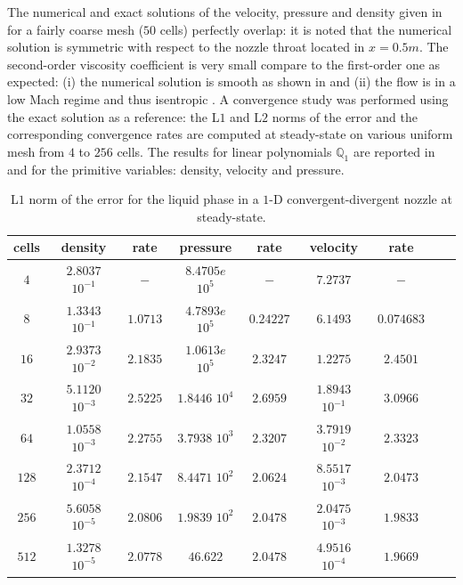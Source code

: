 The numerical and exact solutions of the velocity, pressure and density given in  for a fairly coarse mesh ($50$ cells) perfectly overlap: it is noted that the numerical solution is symmetric with respect to the nozzle throat located in $x=0.5m$. The second-order viscosity coefficient  is very small compare to the first-order one as expected: (i) the numerical solution is smooth as shown in  and (ii) the flow is in a low Mach regime and thus isentropic . A convergence study was performed using the exact solution as a reference: the L$1$ and L$2$ norms of the error and the corresponding convergence rates are computed at steady-state on various uniform mesh from $4$ to $256$ cells. The results for linear polynomials $\mathbb{Q}_1$ are reported in  and  for the primitive variables: density, velocity and pressure.
\begin{table}[H]
\begin{center}
 \caption{\label{tbl:l1_norm_liq} L$1$ norm of the error for the liquid phase in a $1$-D convergent-divergent nozzle at steady-state.}
 \begin{tabular}{|c|c|c|c|c|c|c|c|c|}
 \hline
   cells & density & rate & pressure & rate & velocity & rate \\
 \hline
$4$ &   $2.8037$ $10^{-1}$ & $-$ & $8.4705e$ $10^{5}$ & $-$ & $7.2737$                   & $-$\\
  \hline
$8$  &  $1.3343$ $10^{-1}$ & $1.0713$ & $4.7893e$ $10^{5}$ & $0.24227$ & $6.1493$                   & $0.074683$\\
   \hline
$16$ & $2.9373$ $10^{-2}$ & $2.1835$ & $1.0613e$ $10^{5}$ & $2.3247$ & $1.2275$& $2.4501$\\
 \hline
$32$ & $5.1120$ $10^{-3}$ & $2.5225$ & $1.8446$ $10^{4}$ & $2.6959$ & $1.8943$ $10^{-1}$ & $3.0966$\\
 \hline
$64$ & $1.0558$ $10^{-3}$ & $2.2755$ & $3.7938$ $10^{3}$ & $2.3207$ & $3.7919$ $10^{-2}$ & $2.3323$\\
 \hline
$128$&$2.3712$ $10^{-4}$ & $2.1547$ & $8.4471$ $10^{2}$ & $2.0624$ & $8.5517$ $10^{-3}$ & $2.0473$\\
 \hline
$256$&$5.6058$ $10^{-5}$& $2.0806$ & $1.9839$ $10^{2}$ & $2.0478$ & $2.0475$ $10^{-3}$ & $1.9833$\\
 \hline
 $512$&$1.3278$ $10^{-5}$& $2.0778$ & $46.622$ & $2.0478$ & $4.9516$ $10^{-4}$ & $1.9669$\\
 \hline
\end{tabular}
\end{center}
\nonumber
\end{table}
